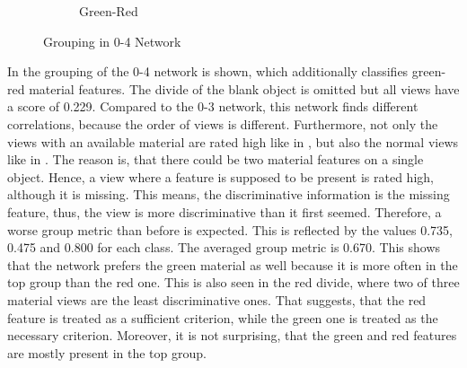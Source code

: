 \begin{figure}
\begin{subfigure}{\textwidth}
		\caption{Green-Red}
		\label{fig:grouping-0-4-green-red}
	\end{subfigure}
	\caption[Grouping in 0-4 Network]{Grouping in 0-4 Network}
	\label{fig:grouping-0-4}
\end{figure}
In  the grouping of the 0-4 network is shown, which additionally classifies green-red material features.
The divide of the blank object is omitted but all views have a score of 0.229.
Compared to the 0-3 network, this network finds different correlations, because the order of views is different.
Furthermore, not only the views with an available material are rated high like in , but also the normal views like in .
The reason is, that there could be two material features on a single object.
Hence, a view where a feature is supposed to be present is rated high, although it is missing.
This means, the discriminative information is the missing feature, thus, the view is more discriminative than it first seemed.
Therefore, a worse group metric than before is expected.
This is reflected by the values 0.735, 0.475 and 0.800 for each class.
The averaged group metric is 0.670.
This shows that the network prefers the green material as well because it is more often in the top group than the red one.
This is also seen in the red divide, where two of three material views are the least discriminative ones.
That suggests, that the red feature is treated as a sufficient criterion, while the green one is treated as the necessary criterion.
Moreover, it is not surprising, that the green and red features are mostly present in the top group.
